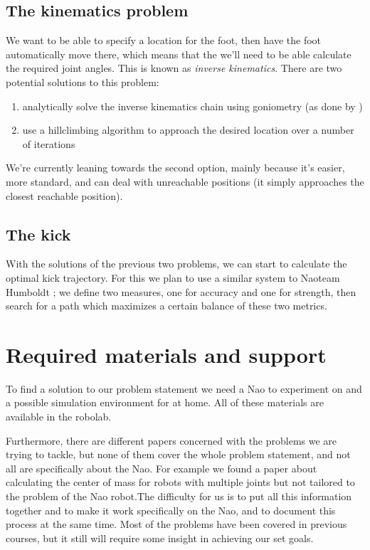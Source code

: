 \documentclass[a4paper]{article}
\begin{document}
\subsection{The kinematics problem}
We want to be able to specify a location for the foot, then have the foot
automatically move there, which means that the we’ll need to be able calculate
the required joint angles. This is known as \emph{inverse kinematics}. There are
two potential solutions to this problem:
\begin{enumerate}
  \item analytically solve the inverse kinematics chain using goniometry (as done by \cite{Graf2009})
\item use a hillclimbing algorithm to approach the desired location over a number of iterations
\end{enumerate}

We're currently leaning towards the second option, mainly because it’s easier,
more standard, and can deal with unreachable positions (it simply approaches the
closest reachable position).

\subsection{The kick}
With the solutions of the previous two problems, we can start to calculate the
optimal kick trajectory. For this we plan to use a similar system to Naoteam
Humboldt \cite{Muller2011}; we define two measures, one for accuracy and one for
strength, then search for a path which maximizes a certain balance of these two
metrics. 



\section{Required materials and support} 
To find a solution to our problem statement we need a Nao to experiment on and a
possible simulation environment for at home. All of these materials are
available in the robolab.

Furthermore, there are different papers concerned with the problems we are
trying to tackle, but none of them cover the whole problem statement, and not
all are specifically about the Nao. For example we found a paper about
calculating the center of mass for robots with multiple joints\cite{Cotton2008} but not tailored
to the problem of the Nao robot.The difficulty for us is to put all this
information together and to make it work specifically on the Nao, and to
document this process at the same time. Most of the problems have been covered
in previous courses, but it still will require some insight in achieving our set
goals.



\end{document}
